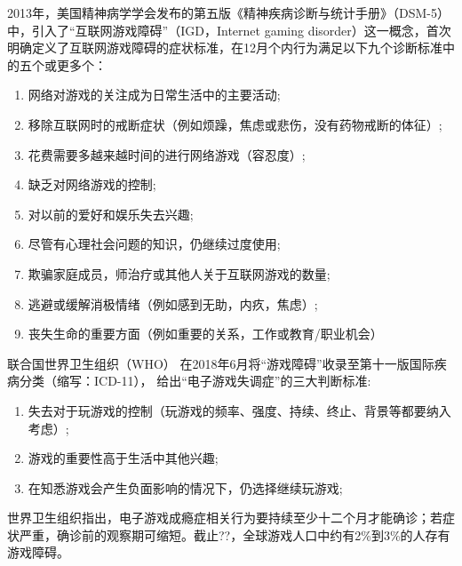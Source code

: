 2013年，美国精神病学学会发布的第五版《精神疾病诊断与统计手册》（DSM-5）中，引入了“互联网游戏障碍”（IGD，Internet gaming disorder）这一概念，首次明确定义了互联网游戏障碍的症状标准，在12月个内行为满足以下九个诊断标准中的五个或更多个：
\begin{enumerate}
\item 网络对游戏的关注成为日常生活中的主要活动; 
\item 移除互联网时的戒断症状（例如烦躁，焦虑或悲伤，没有药物戒断的体征）; 
 \item 花费需要多越来越时间的进行网络游戏（容忍度）; 
\item 缺乏对网络游戏的控制;
\item 对以前的爱好和娱乐失去兴趣; 
\item 尽管有心理社会问题的知识，仍继续过度使用; 
\item 欺骗家庭成员，师治疗或其他人关于互联网游戏的数量; 
\item 逃避或缓解消极情绪（例如感到无助，内疚，焦虑）; 
\item 丧失生命的重要方面（例如重要的关系，工作或教育/职业机会）
\end{enumerate}


联合国世界卫生组织（WHO）%
在2018年6月将“游戏障碍”收录至第十一版国际疾病分类（缩写：ICD-11），
给出“电子游戏失调症”的三大判断标准:
\begin{enumerate}
\item 失去对于玩游戏的控制（玩游戏的频率、强度、持续、终止、背景等都要纳入考虑）;

\item 游戏的重要性高于生活中其他兴趣;

\item 在知悉游戏会产生负面影响的情况下，仍选择继续玩游戏;
 \end{enumerate}
 世界卫生组织指出，电子游戏成瘾症相关行为要持续至少十二个月才能确诊；若症状严重，确诊前的观察期可缩短。截止??，全球游戏人口中约有2\%到3\%的人存有游戏障碍。
 
